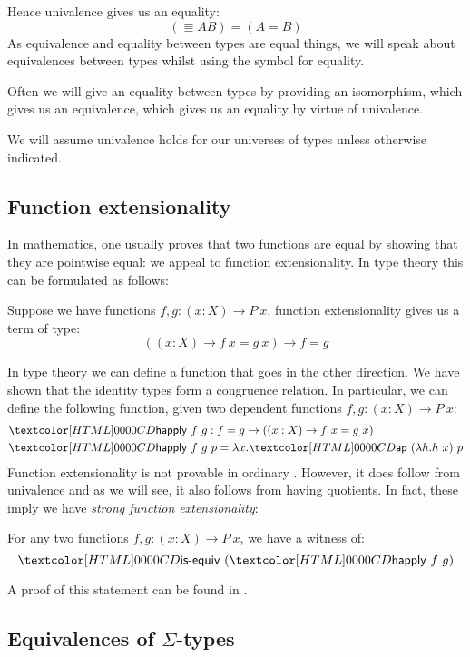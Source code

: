 Hence univalence gives us an equality:
$$
(\Equiv{A}{B}) = (A = B)
$$
As equivalence and equality between types are equal things, we will
speak about equivalences between types whilst using the symbol for
equality.

Often we will give an equality between types by providing an
isomorphism, which gives us an equivalence, which gives us an equality
by virtue of univalence.

We will assume univalence holds for our universes of types unless
otherwise indicated.

\subsection{Function extensionality}

In mathematics, one usually proves that two functions are equal by
showing that they are pointwise equal: we appeal to function
extensionality. In type theory this can be formulated as follows:
%
\begin{definition}
  Suppose we have functions $f, g : (x : X) \to P\ x$, function
  extensionality gives us a term of type:
  $$
  ((x : X) \to f\ x = g\ x) \to f = g
  $$
\end{definition}
%
In type theory we can define a function that goes in the other
direction. We have shown that the identity types form a congruence
relation. In particular, we can define the following function, given
two dependent functions $f, g : (x : X) \to P\ x$:
%
\begin{align*}
  &\happly\ f\ g : f = g \to ((x : X) \to f\ x = g\ x) \\
  &\happly\ f\ g\ p = \lambda x . \ap\ (\lambda h . h\ x)\ p
\end{align*}
%
Function extensionality is not provable in ordinary \mltt. However, it
does follow from univalence and as we will see, it also follows from
having quotients. In fact, these imply we have \emph{strong function
  extensionality}:

\begin{proposition}
  For any two functions $f, g : (x : X) \to P\ x$, we have a witness of:
  $$
  \isequiv\ (\happly\ f\ g)
  $$
\end{proposition}
%
A proof of this statement can be found in \cite{UFP2013}.

\subsection{Equivalences of $\Sigma$-types}

